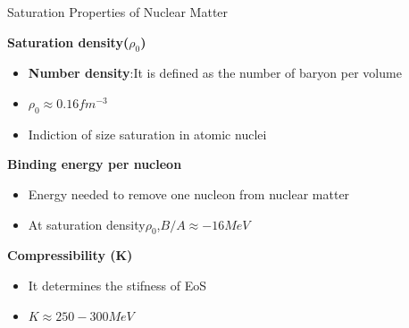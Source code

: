 \documentclass[12pt,aspectratio169]{beamer}
\begin{document}
\begin{frame}{Saturation Properties of Nuclear Matter}
\begin{block}{\textbf{Saturation density($\rho_0$)}}
     \begin{itemize}
        \item \textbf{Number density}:It is defined as the number of baryon per volume
        \item $\rho_0 \approx $$  0.16 fm^{-3} $ 
        \item Indiction of size saturation in atomic nuclei
    \end{itemize}
\end{block}
\begin{block}{\textbf{Binding energy per nucleon}}
    \begin{itemize}
        \item Energy needed to remove one nucleon from nuclear matter
        \item At saturation density$\rho_0$,$B/A \approx -16 MeV$
    \end{itemize}
\end{block}
\begin{block}{\textbf{Compressibility (K)}}
\begin{itemize}
    \item It determines the stifness of EoS
    \item $K  \approx 250- 300MeV$
\end{itemize}
    
\end{block}
   
\end{frame}
\end{document}
